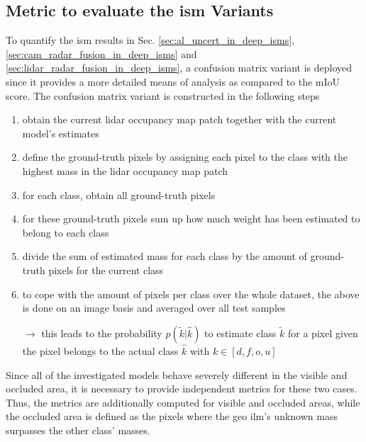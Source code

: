 \subsection{Metric to evaluate the \gls{ism} Variants}
\label{subsec:confusion_matrix}
To quantify the \gls{ism} results in Sec. \ref{sec:al_uncert_in_deep_isms}, \ref{sec:cam_radar_fusion_in_deep_isms} and \ref{sec:lidar_radar_fusion_in_deep_isms}, a confusion matrix variant is deployed since it provides a more detailed means of analysis as compared to the mIoU score. The confusion matrix variant is constructed in the following steps  
\begin{enumerate}
	\item obtain the current lidar occupancy map patch together with the current model's estimates
	\item define the ground-truth pixels by assigning each pixel to the class with the highest mass in the lidar occupancy map patch 
	\item for each class, obtain all ground-truth pixels 
	\item for these ground-truth pixels sum up how much weight has been estimated to belong to each class
	\item divide the sum of estimated mass for each class by the amount of ground-truth pixels for the current class 
	\item to cope with the amount of pixels per class over the whole dataset, the above is done on an image basis and averaged over all test samples
	\item[$\rightarrow$] this leads to the probability $p(\tilde{k}|\hat{k})$ to estimate class $\tilde{k}$ for a pixel given the pixel belongs to the actual class $\hat{k}$ with $k \in [d, f, o, u]$
\end{enumerate}
Since all of the investigated models behave severely different in the visible and occluded area, it is necessary to provide independent metrics for these two cases. Thus, the metrics are additionally computed for visible and occluded areas, while the occluded area is defined as the pixels where the geo \gls{ilm}'s unknown mass surpasses the other class' masses.
%
